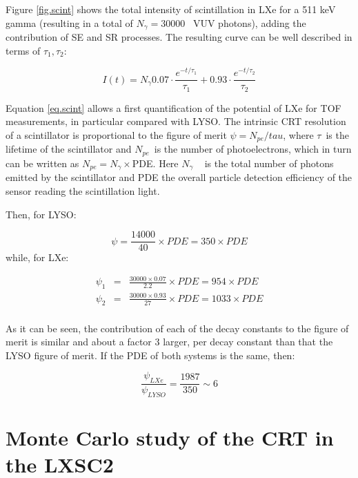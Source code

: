 \documentclass[review]{elsarticle}
\begin{document}
Figure \ref{fig.scint} shows the total intensity of scintillation in LXe for a 511 keV gamma (resulting in a total of $N_\gamma =30000$~ VUV photons), adding the contribution of SE and SR processes. The resulting curve can be well described in terms of $\tau_1, \tau_2$: 

\begin{equation}
I(t) = N_\gamma 0.07 \cdot \frac{e^{-t/\tau_1}}{\tau_1} + 0.93 \cdot \frac{e^{-t/\tau_2}}{\tau_2}
\label{eq.scint}
\end{equation}

Equation \ref{eq.scint} allows a first quantification of the potential of LXe for TOF measurements, in particular compared with LYSO. The intrinsic CRT resolution of a scintillator is proportional to the figure of merit 
$\psi = N_{pe}/tau$, where $\tau$~is the lifetime of the scintillator and $N_{pe}$~is the number of photoelectrons, which in turn can be written as $N_{pe} = N_\gamma \times $PDE. Here $N_\gamma$ ~ is the total number of photons emitted by the scintillator and PDE the overall particle detection efficiency of the sensor reading the scintillation light. 

Then, for LYSO: 

\begin{equation}
\psi = \frac{14000}{40} \times PDE = 350 \times PDE
\label{eq.lysoScint}
\end{equation}
%
while, for LXe:

\begin{eqnarray}
\psi_1 &=& \frac{30000 \times 0.07}{2.2} \times PDE = 954 \times PDE \\
\psi_2 &=& \frac{30000 \times 0.93}{27} \times PDE = 1033 \times PDE \\
\end{eqnarray}

As it can be seen, the contribution of each of the decay constants to the figure of merit is similar and about a factor 3 larger, per decay constant than that the LYSO figure of merit. If the PDE of both systems is the same, then: 

\begin{equation}
\frac{\psi_{LXe}}{\psi_{LYSO}} = \frac{1987}{350} \sim 6
\label{eq.ratioScint}
\end{equation}

\section{Monte Carlo study of the CRT in the LXSC2}
\end{document}
